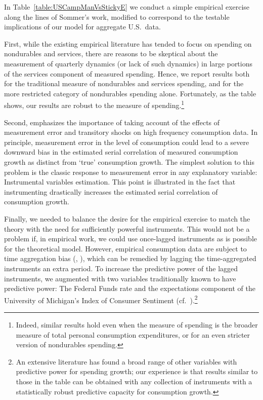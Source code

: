 

In Table~\ref{table:USCampManVsStickyE} we conduct a simple empirical exercise along the lines of Sommer's work, modified to correspond to the testable implications of our model for aggregate U.S.\ data.

First, while the existing empirical literature has tended to focus on spending on nondurables and services, there are reasons to be skeptical about the measurement of quarterly dynamics (or lack of such dynamics) in large portions of the services component of measured spending.
Hence, we report results both for the traditional measure of nondurables and services spending, and for the more restricted category of nondurables spending alone.  Fortunately, as the table shows, our results are robust to the measure of spending.\footnote{Indeed, similar results hold even when the measure of spending is the broader measure of total personal consumption expenditures, or for an even stricter version of nondurables spending.}

Second, \cite{som07} emphasizes the importance of taking account of the effects of measurement error and transitory shocks on high frequency consumption data.  In principle, measurement error in the level of consumption could lead to a severe downward bias in the estimated serial correlation of measured consumption growth as distinct from `true' consumption growth.  The simplest solution to this problem is the classic response to measurement error in any explanatory variable: Instrumental variables estimation.  This point is illustrated in the fact that instrumenting drastically increases the estimated serial correlation of consumption growth.

Finally, we needed to balance the desire for the empirical exercise to match the theory with the need for sufficiently powerful instruments.  This would not be a problem if, in empirical work, we could use once-lagged instruments as is possible for the theoretical model.  However, empirical consumption data are subject to time aggregation bias (\cite{workingTimeAgg}, \cite{cmModel}), which can be remedied by lagging the time-aggregated instruments an extra period.  To increase the predictive power of the lagged instruments, we augmented with two variables traditionally known to have predictive power: The Federal Funds rate and the expectations component of the University of Michigan's Index of Consumer Sentiment (cf.\ \cite{cfwSentiment}).\footnote{An extensive literature has found a broad range of other variables with predictive power for spending growth; our experience is that results similar to those in the table can be obtained with any collection of instruments with a statistically robust predictive capacity for consumption growth.}

